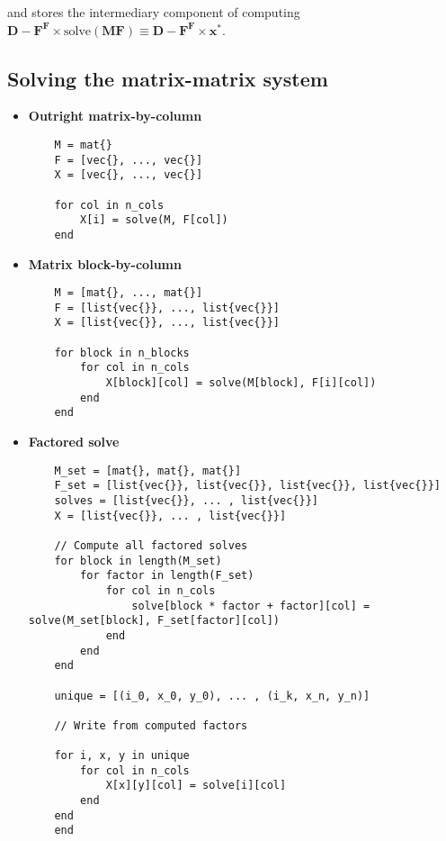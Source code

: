 \noindent and stores the intermediary component of computing $\textbf{D} - \textbf{F}^\textbf{F} \times \text{solve}(\textbf{MF}) \equiv \textbf{D} - \textbf{F}^\textbf{F} \times \textbf{x}^{*}$.


\noindent

\subsection{Solving the matrix-matrix system}

\begin{itemize}
    \item \textbf{Outright matrix-by-column} 
    \begin{lstlisting} 
    M = mat{}
    F = [vec{}, ..., vec{}]
    X = [vec{}, ..., vec{}]

    for col in n_cols
        X[i] = solve(M, F[col])
    end\end{lstlisting}
    \item \textbf{Matrix block-by-column} 
    \begin{lstlisting} 
    M = [mat{}, ..., mat{}]
    F = [list{vec{}}, ..., list{vec{}}]
    X = [list{vec{}}, ..., list{vec{}}]

    for block in n_blocks
        for col in n_cols
            X[block][col] = solve(M[block], F[i][col])
        end
    end\end{lstlisting}

    \item \textbf{Factored solve} 
    \begin{lstlisting} 
    M_set = [mat{}, mat{}, mat{}]
    F_set = [list{vec{}}, list{vec{}}, list{vec{}}, list{vec{}}]
    solves = [list{vec{}}, ... , list{vec{}}]
    X = [list{vec{}}, ... , list{vec{}}]

    // Compute all factored solves 
    for block in length(M_set) 
        for factor in length(F_set)
            for col in n_cols
                solve[block * factor + factor][col] = solve(M_set[block], F_set[factor][col])
            end
        end
    end

    unique = [(i_0, x_0, y_0), ... , (i_k, x_n, y_n)]

    // Write from computed factors 

    for i, x, y in unique 
        for col in n_cols 
            X[x][y][col] = solve[i][col]
        end
    end
    end\end{lstlisting}

\end{itemize}